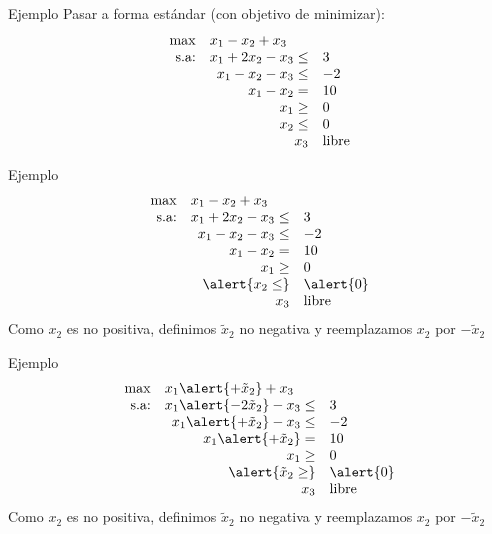 \documentclass[10pt, aspectratio=169]{beamer}
\begin{document}
    \begin{frame}{Ejemplo}
        Pasar a forma estándar (con objetivo de minimizar):
        \[\begin{array}{rrl}
              \max & \multicolumn{2}{l}{x_1 - x_2 + x_3} \\
              \text{s.a:} & x_1 + 2x_2 - x_3 \leq & 3            \\
              & x_1 - x_2 - x_3 \leq  & -2           \\
              & x_1 - x_2 =           & 10           \\
              & x_1\geq               & 0            \\
              & x_2\leq               & 0            \\
              & x_3                   & \text{libre}
        \end{array}
        \]
    \end{frame}


    \begin{frame}{Ejemplo}
        \[\begin{array}{rrl}
              \max & \multicolumn{2}{l}{x_1 - x_2 + x_3} \\
              \text{s.a:} & x_1 + 2x_2 - x_3 \leq & 3            \\
              & x_1 - x_2 - x_3 \leq  & -2           \\
              & x_1 - x_2 =           & 10           \\
              & x_1\geq               & 0            \\
              & \alert{x_2\leq}       & \alert{0}    \\
              & x_3                   & \text{libre}
        \end{array}
        \]
        Como $x_2$ es no positiva, definimos $\tilde{x}_2$ no negativa y reemplazamos $x_2$ por $-\tilde{x}_2$
    \end{frame}

    \begin{frame}{Ejemplo}
        \[\begin{array}{rrl}
              \max & \multicolumn{2}{l}{x_1 \alert{+ \tilde{x}_2} + x_3} \\
              \text{s.a:} & x_1 \alert{-2\tilde{x}_2} - x_3 \leq & 3            \\
              & x_1 \alert{+\tilde{x}_2} - x_3 \leq  & -2           \\
              & x_1 \alert{+\tilde{x}_2} =           & 10           \\
              & x_1\geq                              & 0            \\
              & \alert{\tilde{x}_2 \geq}             & \alert{0}    \\
              & x_3                                  & \text{libre}
        \end{array}
        \]
        Como $x_2$ es no positiva, definimos $\tilde{x}_2$ no negativa y reemplazamos $x_2$ por $-\tilde{x}_2$
    \end{frame}
\end{document}
